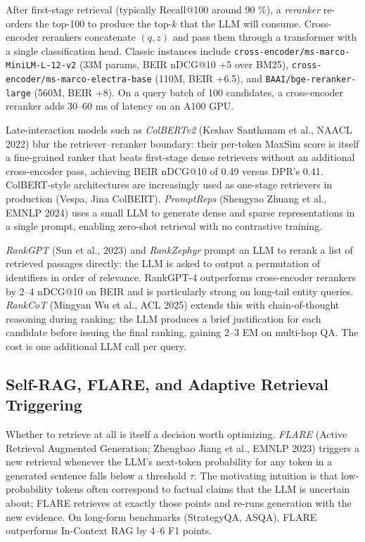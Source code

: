 \documentclass{article}
\begin{document}
After first-stage retrieval (typically Recall@100 around 90 \%), a \emph{reranker} re-orders the top-100 to produce the top-\(k\) that the LLM will consume. Cross-encoder rerankers concatenate \((q, z)\) and pass them through a transformer with a single classification head. Classic instances include \texttt{cross-encoder/ms-marco-MiniLM-L-12-v2} (33M params, BEIR nDCG@10 +5 over BM25), \texttt{cross-encoder/ms-marco-electra-base} (110M, BEIR +6.5), and \texttt{BAAI/bge-reranker-large} (560M, BEIR +8). On a query batch of 100 candidates, a cross-encoder reranker adds 30--60 ms of latency on an A100 GPU.

Late-interaction models such as \emph{ColBERTv2} (Keshav Santhanam et al., NAACL 2022) blur the retriever--reranker boundary: their per-token MaxSim score is itself a fine-grained ranker that beats first-stage dense retrievers without an additional cross-encoder pass, achieving BEIR nDCG@10 of 0.49 versus DPR's 0.41. ColBERT-style architectures are increasingly used as one-stage retrievers in production (Vespa, Jina ColBERT). \emph{PromptReps} (Shengyao Zhuang et al., EMNLP 2024) uses a small LLM to generate dense and sparse representations in a single prompt, enabling zero-shot retrieval with no contrastive training.

\emph{RankGPT} (Sun et al., 2023) and \emph{RankZephyr} prompt an LLM to rerank a list of retrieved passages directly: the LLM is asked to output a permutation of identifiers in order of relevance. RankGPT-4 outperforms cross-encoder rerankers by 2--4 nDCG@10 on BEIR and is particularly strong on long-tail entity queries. \emph{RankCoT} (Mingyan Wu et al., ACL 2025) extends this with chain-of-thought reasoning during ranking: the LLM produces a brief justification for each candidate before issuing the final ranking, gaining 2--3 EM on multi-hop QA. The cost is one additional LLM call per query.

\subsection{Self-RAG, FLARE, and Adaptive Retrieval Triggering}\label{self-rag-flare-and-adaptive-retrieval-triggering}

Whether to retrieve at all is itself a decision worth optimizing. \emph{FLARE} (Active Retrieval Augmented Generation; Zhengbao Jiang et al., EMNLP 2023) triggers a new retrieval whenever the LLM's next-token probability for any token in a generated sentence falls below a threshold \(\tau\). The motivating intuition is that low-probability tokens often correspond to factual claims that the LLM is uncertain about; FLARE retrieves at exactly those points and re-runs generation with the new evidence. On long-form benchmarks (StrategyQA, ASQA), FLARE outperforms In-Context RAG by 4--6 F1 points.
\end{document}
